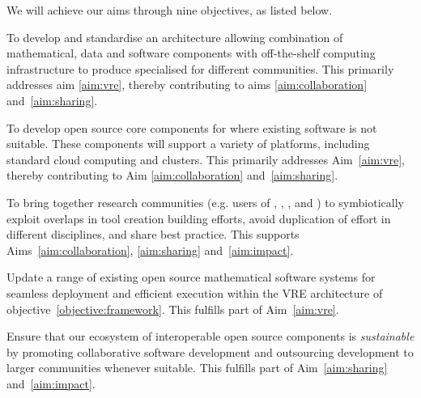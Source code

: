 \documentclass[noworkareas,deliverables,\classoptions]{euproposal}       %
\begin{document}
\begin{proposal}
We will achieve our aims through nine objectives, as listed below.

\begin{compactenum}
\item\label{objective:framework} To develop and standardise an
  architecture allowing combination of mathematical, data and software
  components with off-the-shelf computing infrastructure to produce
  specialised \VREs for different communities. 
  This
  primarily addresses aim \ref{aim:vre}, thereby contributing to aims
  \ref{aim:collaboration} and~\ref{aim:sharing}. %

\item\label{objectives:core} To develop open source core components
  for \VREs where existing software is not suitable. These components
  will support a variety of platforms, including standard cloud
  computing and clusters. This primarily addresses Aim~\ref{aim:vre},
  thereby contributing to Aim \ref{aim:collaboration}
  and~\ref{aim:sharing}.

\item \label{objective:community} To bring together research
  communities (e.g. users of \Jupyter, \Sage, \Singular, and \GAP) to
  symbiotically exploit overlaps in tool creation building efforts,
  avoid duplication of effort in different disciplines, and share best
  practice. This supports Aims~\ref{aim:collaboration},
  \ref{aim:sharing} and~\ref{aim:impact}.

\item \label{objective:updates} Update a range of existing open source
  mathematical software systems for seamless deployment and efficient
  execution within the VRE architecture of objective~\ref{objective:framework}.
  This fulfills part of Aim~\ref{aim:vre}.



\item \label{objective:sustainable} Ensure that our ecosystem of
  interoperable open source components is \emph{sustainable} by
  promoting collaborative software development and outsourcing
  development to larger communities whenever suitable. This fulfills
  part of Aim~\ref{aim:sharing} and~\ref{aim:impact}.


\end{compactenum}
\end{proposal}
\end{document}
